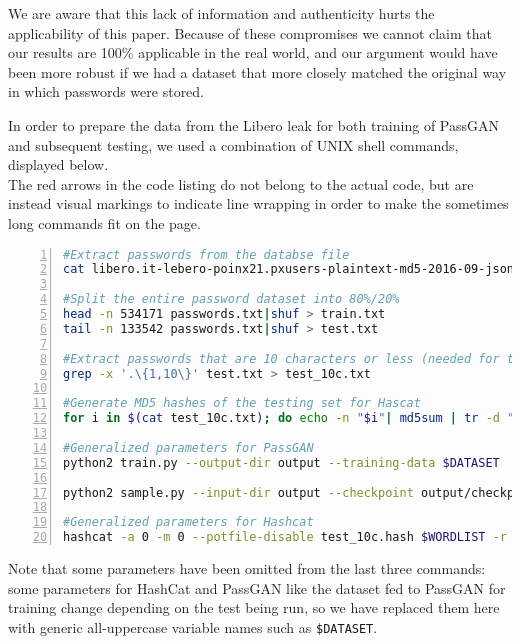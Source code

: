 We are aware that this lack of information and authenticity hurts the applicability of this paper. Because of these compromises we cannot claim that our results are 100\% applicable in the real world, and our argument would have been more robust if we had a dataset that more closely matched the original way in which passwords were stored. %

In order to prepare the data from the Libero leak for both training of PassGAN and subsequent testing, we used a combination of UNIX shell commands, displayed below.\\
The red arrows in the code listing do not belong to the actual code, but are instead visual markings to indicate line wrapping in order to make the sometimes long commands fit on the page.
\begin{lstlisting}[language=bash,numbers=left,stepnumber=1,breaklines=true,postbreak=\mbox{\textcolor{red}{$\hookrightarrow$}\space}]
#Extract passwords from the databse file
cat libero.it-lebero-poinx21.pxusers-plaintext-md5-2016-09-json-900k-users-extremely-private.txt|grep clearPassword |cut -d ":" -f 2 | awk '{gsub ("\"","");gsub(",","");print $1}' > passwords.txt

#Split the entire password dataset into 80%/20%
head -n 534171 passwords.txt|shuf > train.txt
tail -n 133542 passwords.txt|shuf > test.txt

#Extract passwords that are 10 characters or less (needed for testing)
grep -x '.\{1,10\}' test.txt > test_10c.txt

#Generate MD5 hashes of the testing set for Hascat
for i in $(cat test_10c.txt); do echo -n "$i"| md5sum | tr -d " -" >> test_10c.hash; done

#Generalized parameters for PassGAN
python2 train.py --output-dir output --training-data $DATASET

python2 sample.py --input-dir output --checkpoint output/checkpoints/checkpoint_95000.ckpt --output $WORDLIST -n 14344392

#Generalized parameters for Hashcat
hashcat -a 0 -m 0 --potfile-disable test_10c.hash $WORDLIST -r $RULESET -o out.txt
\end{lstlisting}
Note that some parameters have been omitted from the last three commands: some parameters for HashCat and PassGAN like the dataset fed to PassGAN for training change depending on the test being run, so we have replaced them here with generic all-uppercase variable names such as \texttt{\$DATASET}. 
